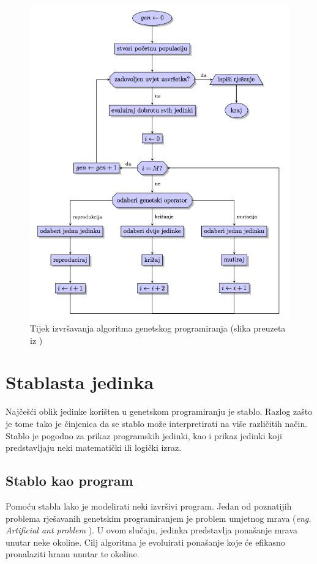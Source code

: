 \begin{figure}[H]
	\centering
	\includegraphics[scale=0.6]{./slike/blokDijagram.png}
	\caption{Tijek izvršavanja algoritma genetskog programiranja (slika preuzeta iz \cite{kokan})}
	\label{tijek}
\end{figure}

\section{Stablasta jedinka}
Najčešći oblik jedinke korišten u genetskom programiranju je stablo. Razlog zašto je tome tako je činjenica da se stablo može interpretirati na više različitih način. Stablo je pogodno za prikaz programskih jedinki, kao i prikaz jedinki koji predstavljaju neki matematički ili logički izraz.


\subsection{Stablo kao program}
Pomoću stabla lako je modelirati neki izvršivi program. Jedan od poznatijih problema rješavanih genetskim programiranjem je problem umjetnog mrava (\textit{eng. Artificial ant problem} \cite{koza}). U ovom slučaju, jedinka predstavlja ponašanje mrava unutar neke okoline. Cilj algoritma je evoluirati ponašanje koje će efikasno pronalaziti hranu unutar te okoline.

